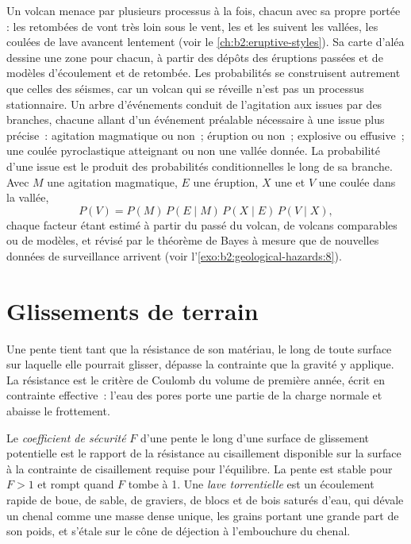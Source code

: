 Un volcan menace par plusieurs processus à la fois, chacun avec sa propre portée : les retombées de 
vont très loin sous le vent, les  et les  suivent les vallées,
les coulées de lave avancent lentement (voir le \cref{ch:b2:eruptive-styles}). Sa carte d'aléa dessine une
zone pour chacun, à partir des dépôts des éruptions passées et de modèles d'écoulement et de retombée.
Les probabilités se construisent autrement que celles des séismes, car un volcan qui se réveille n'est
pas un processus stationnaire. Un arbre d'événements conduit de l'agitation aux issues par des branches,
chacune allant d'un événement préalable nécessaire à une issue plus précise~: agitation magmatique ou non~;
éruption ou non~; explosive ou effusive~; une coulée pyroclastique atteignant ou non une vallée donnée.
La probabilité d'une issue est le produit des probabilités conditionnelles le long de sa branche. Avec $M$
une agitation magmatique, $E$ une éruption, $X$ une  et $V$ une coulée dans la vallée,
\begin{equation*}
P(V) = P(M) \, P(E \mid M) \, P(X \mid E) \, P(V \mid X),
\end{equation*}
chaque facteur étant estimé à partir du passé du volcan, de volcans comparables ou de modèles, et révisé par le
théorème de Bayes à mesure que de nouvelles données de surveillance arrivent (voir l'\cref{exo:b2:geological-hazards:8}).

\section{Glissements de terrain}\label{sec:b2:geological-hazards:landslides}

Une pente tient tant que la résistance de son matériau, le long de toute surface sur
laquelle elle pourrait glisser, dépasse la contrainte que la gravité y applique. La
résistance est le critère de Coulomb du volume de première année, écrit en contrainte
effective~: l'eau des pores porte une partie de la charge normale et abaisse le frottement.

\begin{definition}\label{def:b2:geological-hazards:slope}
Le \emph{coefficient de sécurité} $F$ d'une pente le long d'une surface
de glissement potentielle est le rapport de la résistance au cisaillement disponible sur la surface à la
contrainte de cisaillement requise pour l'équilibre. La pente est stable pour $F > 1$ et rompt quand $F$
tombe à 1. Une \emph{lave torrentielle} est un écoulement rapide de boue, de sable,
de graviers, de blocs et de bois saturés d'eau, qui dévale un chenal comme une masse dense unique, les
grains portant une grande part de son poids, et s'étale sur le cône de déjection à l'embouchure du chenal.
\end{definition}

